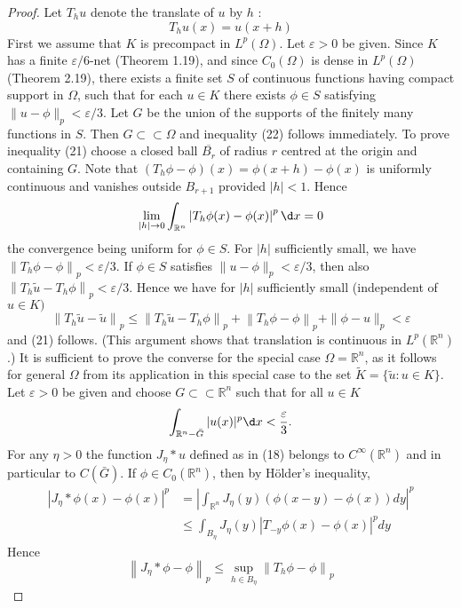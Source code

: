 \begin{proof}
  Let $T_h u$ denote the translate of $u$ by $h$ :
  \[
  T_h u(x)=u(x+h)
  \]
  First we assume that $K$ is precompact in $L^p(\Omega)$. Let $\varepsilon>0$ be given. Since $K$ has a finite $\varepsilon / 6$-net (Theorem 1.19), and since $C_0(\Omega)$ is dense in $L^p(\Omega)$ (Theorem 2.19), there exists a finite set $S$ of continuous functions having compact support in $\Omega$, such that for each $u \in K$ there exists $\phi \in S$ satisfying $\|u-\phi\|_p<\varepsilon / 3$. Let $G$ be the union of the supports of the finitely many functions in $S$. Then $G \subset\subset \Omega$ and inequality (22) follows immediately. To prove inequality (21) choose a closed ball $\overline{B_r}$ of radius $r$ centred at the origin and containing $G$. Note that $\left(T_h \phi-\phi\right)(x)=\phi(x+h)-\phi(x)$ is uniformly continuous and vanishes outside $B_{r+1}$ provided $|h|<1$. Hence
  \[
  \lim _{|h| \rightarrow 0} \int_{\mathbb{R}^n}\left|T_h \phi(x)-\phi(x)\right|^p \d x=0
  \]
  the convergence being uniform for $\phi \in S$. For $|h|$ sufficiently small, we have $\left\|T_h \phi-\phi\right\|_p<\varepsilon / 3$. If $\phi \in S$ satisfies $\|u-\phi\|_p<\varepsilon / 3$, then also $\left\|T_h \tilde{u}-T_h \phi\right\|_p<\varepsilon / 3$. Hence we have for $|h|$ sufficiently small (independent of $u \in K)$
  \[
  \left\|T_h \tilde{u}-\tilde{u}\right\|_p \leq\left\|T_h \tilde{u}-T_h \phi\right\|_p+\left\|T_h \phi-\phi\right\|_p+\|\phi-u\|_p<\varepsilon
  \]
  and (21) follows. (This argument shows that translation is continuous in $L^p(\mathbb{R}^n)$.)
  It is sufficient to prove the converse for the special case $\Omega=\mathbb{R}^n$, as it follows for general $\Omega$ from its application in this special case to the set $\tilde{K}=\{\tilde{u}: u \in K\}$.
  Let $\varepsilon>0$ be given and choose $G \subset\subset \mathbb{R}^n$ such that for all $u \in K$
  \[
  \int_{\mathbb{R}^n-\bar{G}}|u(x)|^p \d x<\frac{\varepsilon}{3} .
  \]
  For any $\eta>0$ the function $J_\eta * u$ defined as in (18) belongs to $C^{\infty}(\mathbb{R}^n)$ and in particular to $C(\bar{G})$. If $\phi \in C_0(\mathbb{R}^n)$, then by Hölder's inequality,
  \[
  \begin{aligned}
  \left|J_\eta * \phi(x)-\phi(x)\right|^p & =\left|\int_{\mathbb{R}^n} J_\eta(y)(\phi(x-y)-\phi(x)) d y\right|^p \\
  & \leq \int_{B_\eta} J_\eta(y)\left|T_{-y} \phi(x)-\phi(x)\right|^p d y
  \end{aligned}
  \]
  Hence
  \[
  \left\|J_\eta * \phi-\phi\right\|_p \leq \sup _{h \in B_\eta}\left\|T_h \phi-\phi\right\|_p
\]
\end{proof}
